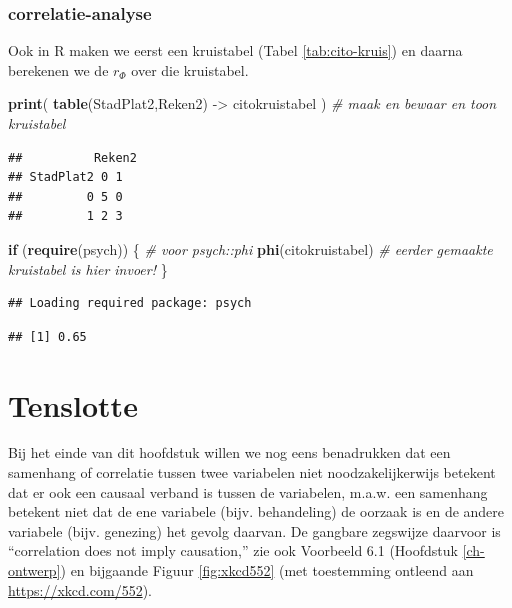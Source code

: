 \documentclass[
]{book}
\newenvironment{Shaded}{\begin{snugshade}}{\end{snugshade}}
\newcommand{\CommentTok}[1]{\textcolor[rgb]{0.56,0.35,0.01}{\textit{#1}}}
\newcommand{\ControlFlowTok}[1]{\textcolor[rgb]{0.13,0.29,0.53}{\textbf{#1}}}
\newcommand{\FunctionTok}[1]{\textcolor[rgb]{0.13,0.29,0.53}{\textbf{#1}}}
\newcommand{\NormalTok}[1]{#1}
\newcommand{\OtherTok}[1]{\textcolor[rgb]{0.56,0.35,0.01}{#1}}
\begin{document}
\subsubsection{correlatie-analyse}\label{correlatie-analyse-2}

Ook in R maken we eerst een kruistabel (Tabel \ref{tab:cito-kruis}) en daarna berekenen we de \(r_\Phi\) over die kruistabel.

\begin{Shaded}
\begin{Highlighting}[]
\FunctionTok{print}\NormalTok{( }\FunctionTok{table}\NormalTok{(StadPlat2,Reken2) }\OtherTok{{-}\textgreater{}}\NormalTok{ citokruistabel ) }\CommentTok{\# maak en bewaar en toon kruistabel}
\end{Highlighting}
\end{Shaded}

\begin{verbatim}
##          Reken2
## StadPlat2 0 1
##         0 5 0
##         1 2 3
\end{verbatim}

\begin{Shaded}
\begin{Highlighting}[]
\ControlFlowTok{if}\NormalTok{ (}\FunctionTok{require}\NormalTok{(psych)) \{ }\CommentTok{\# voor psych::phi}
  \FunctionTok{phi}\NormalTok{(citokruistabel) }\CommentTok{\# eerder gemaakte kruistabel is hier invoer!}
\NormalTok{\}}
\end{Highlighting}
\end{Shaded}

\begin{verbatim}
## Loading required package: psych
\end{verbatim}

\begin{verbatim}
## [1] 0.65
\end{verbatim}

\section{Tenslotte}\label{sec:correlationcausation}

Bij het einde van dit hoofdstuk willen we nog eens benadrukken dat een
samenhang of correlatie tussen twee variabelen niet noodzakelijkerwijs
betekent dat er ook een causaal verband is tussen de variabelen, m.a.w.
een samenhang betekent niet dat de ene variabele (bijv. behandeling) de
oorzaak is en de andere variabele (bijv. genezing) het gevolg daarvan.
De gangbare zegswijze daarvoor is ``correlation does not imply
causation,'' zie ook Voorbeeld 6.1 (Hoofdstuk \ref{ch-ontwerp})
en bijgaande Figuur \ref{fig:xkcd552} (met toestemming ontleend aan \url{https://xkcd.com/552}).
\end{document}
